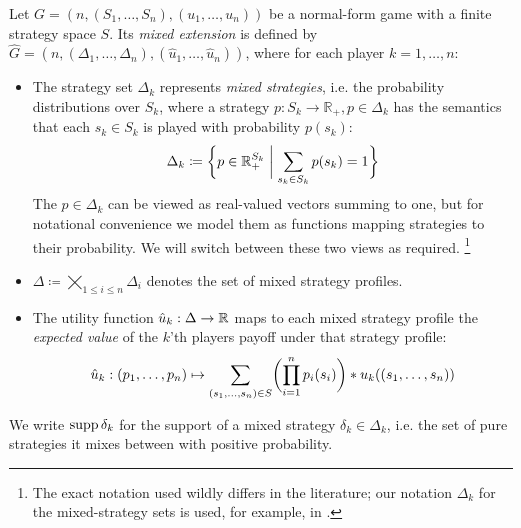 \documentclass[a4paper]{scrreprt}
\newcommand{\Rp}{\mathbb{R}_+}
\begin{document}
    \begin{defn}
        Let $G = (n, (S_1,\dots, S_n), (u_1, \dots, u_n))$ be a normal-form game with a finite strategy space $S$.
        Its \emph{mixed extension} is defined by $\hat{G} = (n, (\Delta_1, \dots, \Delta_n), (\hat{u}_1, \dots, \hat{u}_n))$,
        where for each player $k = 1,\dots,n$:
        \begin{itemize}
            \item 
            The strategy set $\Delta_k$ represents \emph{mixed strategies}, i.e. the probability distributions over $S_k$, where a strategy $p : S_k \to \Rp, p \in \Delta_k$ has the semantics that each $s_k \in S_k$ is played with probability $p(s_k)$:
            \[
                \Delta_k \coloneqq \biggset{ p \in \Rp^{S_k} \biggmid \sum_{s_k \in S_k} p(s_k) = 1 } 
            \]
            The $p \in \Delta_k$ can be viewed as real-valued vectors summing to one, but for notational convenience we model them as functions mapping strategies to their probability. We will switch between these two views as required.
            \footnote{The exact notation used wildly differs in the literature; our notation $\Delta_k$ for the mixed-strategy sets is used, for example, in \cite{bib:quantPropernessProtectiveness}.}
            
            \item $\Delta \coloneqq \bigtimes\limits_{1\leq i \leq n} \Delta_i$ denotes the set of mixed strategy profiles.
            
            \item
            The utility function $\hat{u}_k: \Delta \to \mathbb{R}$ maps to each mixed strategy profile the \emph{expected value} of the $k$'th players payoff under that strategy profile:
            \begin{gather}
                \hat{u}_k: 
                (p_1, \dots, p_n) 
                \mapsto
                \sum_{(s_1, \dots, s_n) \in S} \biggl(\prod_{i=1}^{n} p_i(s_i)\biggr) * u_k( (s_1, \dots, s_n) )
                \label{eq:mixedStrategyUtility}
            \end{gather}
        \end{itemize}
        We write $\operatorname{supp} \delta_k$ for the support of a mixed strategy $\delta_k \in \Delta_k$, i.e. the set of pure strategies it mixes between with positive probability.
    \end{defn}
    
\end{document}
